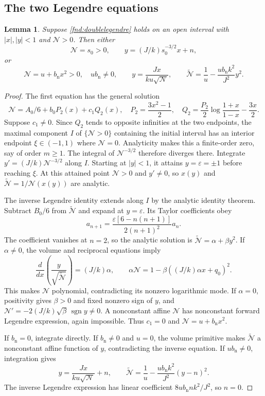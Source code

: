 \documentclass[11pt,a4paper]{article}
\numberwithin{equation}{section}
\theoremstyle{plain}
\newtheorem{lemma}[theorem]{Lemma}
\theoremstyle{definition}
\theoremstyle{remark}
\begin{document}
\subsection{The two Legendre equations}\label{appn:legendreproof}
\begin{lemma}\label{fnd:legendre}
Suppose \eqref{fnd:doublelegendre} holds on an open interval with $|x|,|y|<1$ and $\mathcal N>0$. Then either
\[
\mathcal N=s_0>0,\qquad y=(J/k)s_0^{-3/2}x+n,
\]
or
\begin{equation}\label{fnd:quadraticnorm}
\mathcal N=u+b_{\mathrm n}x^2>0,\quad ub_{\mathrm n}\ne0,\qquad
y=\frac{Jx}{ku\sqrt{\mathcal N}},\qquad
\widetilde{\mathcal N}=\frac1u-\frac{ub_{\mathrm n}k^2}{J^2}y^2.
\end{equation}
\end{lemma}
\begin{proof}
The first equation has the general solution
\[
\mathcal N=A_0/6+b_0P_2(x)+c_1Q_2(x),\quad
P_2=\frac{3x^2-1}{2},\quad
Q_2=\frac{P_2}{2}\log\frac{1+x}{1-x}-\frac{3x}{2}.
\]
Suppose $c_1\ne0$. Since $Q_2$ tends to opposite infinities at the two endpoints, the maximal component $I$ of $\{\mathcal N>0\}$ containing the initial interval has an interior endpoint $\xi\in(-1,1)$ where $\mathcal N=0$. Analyticity makes this a finite-order zero, say of order $m\ge1$. The integral of $\mathcal N^{-3/2}$ therefore diverges there. Integrate $y'=(J/k)\mathcal N^{-3/2}$ along $I$. Starting at $|y|<1$, it attains $y=\varepsilon=\pm1$ before reaching $\xi$. At this attained point $\mathcal N>0$ and $y'\ne0$, so $x(y)$ and $\widetilde{\mathcal N}=1/\mathcal N(x(y))$ are analytic.

The inverse Legendre identity extends along $I$ by the analytic identity theorem. Subtract $B_0/6$ from $\widetilde{\mathcal N}$ and expand at $y=\varepsilon$. Its Taylor coefficients obey
\[
a_{n+1}=\frac{\varepsilon[6-n(n+1)]}{2(n+1)^2}a_n.
\]
The coefficient vanishes at $n=2$, so the analytic solution is $\widetilde{\mathcal N}=\alpha+\beta y^2$. If $\alpha\ne0$, the volume and reciprocal equations imply
\[
\frac{d}{dx}\left(\frac y{\sqrt{\widetilde{\mathcal N}}}\right)=(J/k)\alpha,
\qquad \alpha \mathcal N=1-\beta((J/k)\alpha x+q_0)^2.
\]
This makes $\mathcal N$ polynomial, contradicting its nonzero logarithmic mode. If $\alpha=0$, positivity gives $\beta>0$ and fixed nonzero sign of $y$, and $\mathcal N'=-2(J/k)\sqrt\beta\,\operatorname{sgn}y\ne0$. A nonconstant affine $\mathcal N$ has nonconstant forward Legendre expression, again impossible. Thus $c_1=0$ and $\mathcal N=u+b_{\mathrm n}x^2$.

If $b_{\mathrm n}=0$, integrate directly. If $b_{\mathrm n}\ne0$ and $u=0$, the volume primitive makes $\widetilde{\mathcal N}$ a nonconstant affine function of $y$, contradicting the inverse equation. If $ub_{\mathrm n}\ne0$, integration gives
\[
y=\frac{Jx}{ku\sqrt{\mathcal N}}+n,\qquad
\widetilde{\mathcal N}=\frac1u-\frac{ub_{\mathrm n}k^2}{J^2}(y-n)^2.
\]
The inverse Legendre expression has linear coefficient $8ub_{\mathrm n}nk^2/J^2$, so $n=0$.
\end{proof}
\end{document}

